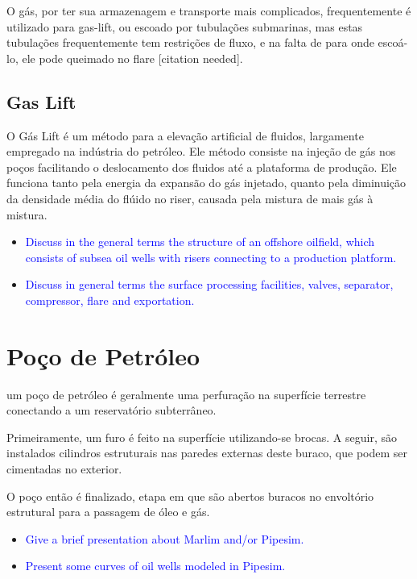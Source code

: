 O gás, por ter sua armazenagem e transporte mais complicados, frequentemente é utilizado para gas-lift, ou escoado por tubulações submarinas, mas estas tubulações frequentemente tem restrições de fluxo, e na falta de para onde escoá-lo, ele pode queimado no flare [citation needed].

\subsection{Gas Lift}
 O Gás Lift é um método para a elevação artificial de
fluidos, largamente empregado na indústria do petróleo. Ele método consiste na
injeção de gás nos poços facilitando o deslocamento dos fluidos até a plataforma de produção. Ele funciona tanto pela energia da expansão do gás injetado, quanto pela diminuição da densidade média do flúido no riser, causada pela mistura de mais gás à mistura.


\begin{itemize}

\item \textcolor{blue}{Discuss in the general terms the structure of an offshore oilfield, which consists of subsea oil wells with risers connecting to a production platform.}


\item \textcolor{blue}{Discuss in general terms the surface processing facilities, valves, separator, compressor, flare and exportation.}

\end{itemize}



\section{Poço de Petróleo}

um poço de petróleo é geralmente uma perfuração na superfície terrestre conectando a um reservatório subterrâneo. 

Primeiramente, um furo é feito na superfície utilizando-se brocas. A seguir, são instalados cilindros estruturais nas paredes externas deste buraco, que podem ser cimentadas no exterior. 

O poço então é finalizado, etapa em que são abertos buracos no envoltório estrutural para a passagem de óleo e gás.


\begin{itemize}

\item \textcolor{blue}{Give a brief presentation about Marlim and/or Pipesim.}

\item \textcolor{blue}{Present some curves of oil wells modeled in Pipesim.}


\end{itemize}
